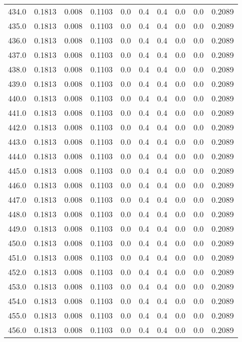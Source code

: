 \begin{longtable}{lrrrrrrrrr}
434.0 & 0.1813 & 0.008 & 0.1103 & 0.0 & 0.4 & 0.4 & 0.0 & 0.0 & 0.2089 \\
435.0 & 0.1813 & 0.008 & 0.1103 & 0.0 & 0.4 & 0.4 & 0.0 & 0.0 & 0.2089 \\
436.0 & 0.1813 & 0.008 & 0.1103 & 0.0 & 0.4 & 0.4 & 0.0 & 0.0 & 0.2089 \\
437.0 & 0.1813 & 0.008 & 0.1103 & 0.0 & 0.4 & 0.4 & 0.0 & 0.0 & 0.2089 \\
438.0 & 0.1813 & 0.008 & 0.1103 & 0.0 & 0.4 & 0.4 & 0.0 & 0.0 & 0.2089 \\
439.0 & 0.1813 & 0.008 & 0.1103 & 0.0 & 0.4 & 0.4 & 0.0 & 0.0 & 0.2089 \\
440.0 & 0.1813 & 0.008 & 0.1103 & 0.0 & 0.4 & 0.4 & 0.0 & 0.0 & 0.2089 \\
441.0 & 0.1813 & 0.008 & 0.1103 & 0.0 & 0.4 & 0.4 & 0.0 & 0.0 & 0.2089 \\
442.0 & 0.1813 & 0.008 & 0.1103 & 0.0 & 0.4 & 0.4 & 0.0 & 0.0 & 0.2089 \\
443.0 & 0.1813 & 0.008 & 0.1103 & 0.0 & 0.4 & 0.4 & 0.0 & 0.0 & 0.2089 \\
444.0 & 0.1813 & 0.008 & 0.1103 & 0.0 & 0.4 & 0.4 & 0.0 & 0.0 & 0.2089 \\
445.0 & 0.1813 & 0.008 & 0.1103 & 0.0 & 0.4 & 0.4 & 0.0 & 0.0 & 0.2089 \\
446.0 & 0.1813 & 0.008 & 0.1103 & 0.0 & 0.4 & 0.4 & 0.0 & 0.0 & 0.2089 \\
447.0 & 0.1813 & 0.008 & 0.1103 & 0.0 & 0.4 & 0.4 & 0.0 & 0.0 & 0.2089 \\
448.0 & 0.1813 & 0.008 & 0.1103 & 0.0 & 0.4 & 0.4 & 0.0 & 0.0 & 0.2089 \\
449.0 & 0.1813 & 0.008 & 0.1103 & 0.0 & 0.4 & 0.4 & 0.0 & 0.0 & 0.2089 \\
450.0 & 0.1813 & 0.008 & 0.1103 & 0.0 & 0.4 & 0.4 & 0.0 & 0.0 & 0.2089 \\
451.0 & 0.1813 & 0.008 & 0.1103 & 0.0 & 0.4 & 0.4 & 0.0 & 0.0 & 0.2089 \\
452.0 & 0.1813 & 0.008 & 0.1103 & 0.0 & 0.4 & 0.4 & 0.0 & 0.0 & 0.2089 \\
453.0 & 0.1813 & 0.008 & 0.1103 & 0.0 & 0.4 & 0.4 & 0.0 & 0.0 & 0.2089 \\
454.0 & 0.1813 & 0.008 & 0.1103 & 0.0 & 0.4 & 0.4 & 0.0 & 0.0 & 0.2089 \\
455.0 & 0.1813 & 0.008 & 0.1103 & 0.0 & 0.4 & 0.4 & 0.0 & 0.0 & 0.2089 \\
456.0 & 0.1813 & 0.008 & 0.1103 & 0.0 & 0.4 & 0.4 & 0.0 & 0.0 & 0.2089 \\

\end{longtable}
